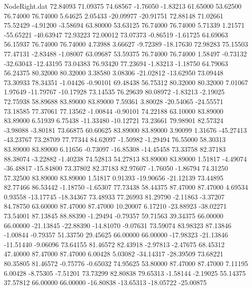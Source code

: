 \begin{filecontents}{NodeRight.dat}
  72.84093   71.09375   74.68567    -1.76050   -1.83213   61.65000   53.62500   76.74000   76.74000    5.64625    2.05433  -20.09977  -20.91751
  72.88148   71.02661   75.52429    -4.91200   -3.58694   63.80000   53.63125   76.74000   76.74000    5.71339    1.21571  -55.65221  -40.63947
  72.93223   72.00012   73.07373    -0.86519   -1.61725   64.69063   56.15937   76.74000   76.74000    4.73988    3.66627   -9.72389  -18.17630
  72.98283   75.15503   77.47131    -2.83488   -1.08007   63.09687   53.59375   76.74000   76.74000    1.58497   -0.73132  -32.63043  -12.43195
  73.04383   76.93420   77.23694    -1.83213   -1.18750   64.79063   56.24375   80.32000   80.32000    3.38580    3.08306  -21.02812  -13.62950
  73.09448   73.30933   78.34351    -1.04426   -0.90101   69.48438   56.75312   80.32000   80.32000    7.01067    1.97649  -11.79767  -10.17928
  73.14535   76.29639   80.08972    -1.83213   -2.19025   72.75938   58.89688   83.89000   83.89000    7.59361    3.80028  -20.54065  -24.55571
  73.18585   77.37061   77.13562    -1.00844   -0.90101   74.22188   63.10000   83.89000   83.89000    6.51939    6.75438  -11.33480  -10.12721
  73.23661   79.98901   82.57324    -3.98088   -3.80181   73.66875   60.60625   83.89000   83.89000    3.90099    1.31676  -45.27413  -43.23767
  73.28709   77.77344   84.62097    -1.50982   -1.29494   76.55000   58.30313   83.89000   83.89000    6.11656   -0.73097  -16.85308  -14.45458
  73.33758   82.37183   88.38074    -3.22882   -1.40238   74.52813   54.27813   83.89000   83.89000    1.51817   -4.49074  -36.48817  -15.84800
  73.37802   82.37183   82.97607    -1.76050   -1.86794   74.31250   57.32500   83.89000   83.89000    1.51817    0.91393  -19.90656  -21.12139
  73.44895   82.77466   86.53442    -1.18750   -1.65307   77.73438   58.44375   87.47000   87.47000    4.69534    0.93558  -13.17745  -18.34367
  73.48933   77.26993   81.29790    -2.11863   -3.37207   84.78750   63.60000   87.47000   87.47000   10.20007    6.17210  -23.88923  -38.02271
  73.54001   87.13845   88.88390    -1.29494   -0.79357   59.71563   39.34375   66.00000   66.00000  -21.13845  -22.88390  -14.81070   -9.07631
  73.59074   83.98323   87.13846    -1.00844   -0.79357   51.33750   29.45625   66.00000   66.00000  -17.98323  -21.13846  -11.51440   -9.06096
  73.64155   81.46572   82.43918    -2.97813   -2.47675   68.45312   47.40000   87.47000   87.47000    6.00428    5.03082  -34.14317  -28.39509
  73.68221   80.35805   81.46572    -0.75776   -0.65032   74.95625   53.80000   87.47000   87.47000    7.11195    6.00428   -8.75305   -7.51201
  73.73299   82.80838   79.65313    -1.58144   -2.19025   55.14375   37.57812   66.00000   66.00000  -16.80838  -13.65313  -18.05722  -25.00875

\end{filecontents}
